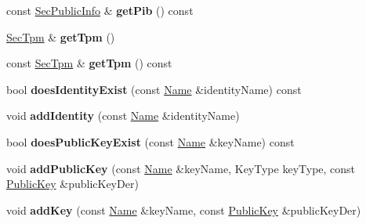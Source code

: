 \begin{DoxyCompactItemize}
\item 
const \hyperlink{classndn_1_1SecPublicInfo}{Sec\+Public\+Info} \& {\bfseries get\+Pib} () const\hypertarget{classndn_1_1security_1_1KeyChain_ac1749a190c33f41b16c5ee30af31ee2e}{}\label{classndn_1_1security_1_1KeyChain_ac1749a190c33f41b16c5ee30af31ee2e}

\item 
\hyperlink{classndn_1_1SecTpm}{Sec\+Tpm} \& {\bfseries get\+Tpm} ()\hypertarget{classndn_1_1security_1_1KeyChain_a965195c7f06b37da5cd2b49f6ae9df52}{}\label{classndn_1_1security_1_1KeyChain_a965195c7f06b37da5cd2b49f6ae9df52}

\item 
const \hyperlink{classndn_1_1SecTpm}{Sec\+Tpm} \& {\bfseries get\+Tpm} () const\hypertarget{classndn_1_1security_1_1KeyChain_adebbf7d6474ae23f48b59b1b6f70f6e5}{}\label{classndn_1_1security_1_1KeyChain_adebbf7d6474ae23f48b59b1b6f70f6e5}

\item 
bool {\bfseries does\+Identity\+Exist} (const \hyperlink{classndn_1_1Name}{Name} \&identity\+Name) const\hypertarget{classndn_1_1security_1_1KeyChain_ac0c3b0b6c89114bfa997378fe6887baf}{}\label{classndn_1_1security_1_1KeyChain_ac0c3b0b6c89114bfa997378fe6887baf}

\item 
void {\bfseries add\+Identity} (const \hyperlink{classndn_1_1Name}{Name} \&identity\+Name)\hypertarget{classndn_1_1security_1_1KeyChain_a2e91bc7c941effef105d33a9a0a35b49}{}\label{classndn_1_1security_1_1KeyChain_a2e91bc7c941effef105d33a9a0a35b49}

\item 
bool {\bfseries does\+Public\+Key\+Exist} (const \hyperlink{classndn_1_1Name}{Name} \&key\+Name) const\hypertarget{classndn_1_1security_1_1KeyChain_ab0ef1c37027b72c2a42a6dbe6323cc40}{}\label{classndn_1_1security_1_1KeyChain_ab0ef1c37027b72c2a42a6dbe6323cc40}

\item 
void {\bfseries add\+Public\+Key} (const \hyperlink{classndn_1_1Name}{Name} \&key\+Name, Key\+Type key\+Type, const \hyperlink{classndn_1_1PublicKey}{Public\+Key} \&public\+Key\+Der)\hypertarget{classndn_1_1security_1_1KeyChain_ac9d2138f086124f253d38cf5cd429e23}{}\label{classndn_1_1security_1_1KeyChain_ac9d2138f086124f253d38cf5cd429e23}

\item 
void {\bfseries add\+Key} (const \hyperlink{classndn_1_1Name}{Name} \&key\+Name, const \hyperlink{classndn_1_1PublicKey}{Public\+Key} \&public\+Key\+Der)\hypertarget{classndn_1_1security_1_1KeyChain_a7360bd0d0ff1574bbfac946f5b426fc2}{}\label{classndn_1_1security_1_1KeyChain_a7360bd0d0ff1574bbfac946f5b426fc2}


\end{DoxyCompactItemize}
